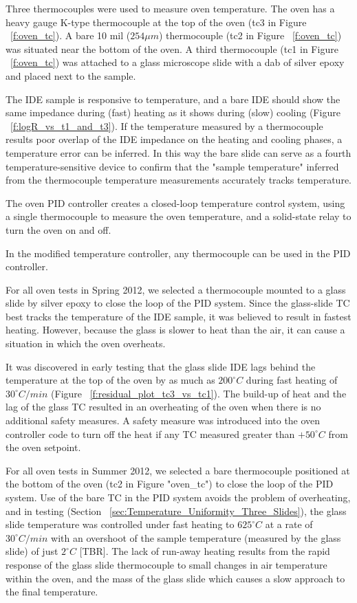\documentclass[12pt,oneside,english]{article}
\begin{document}
	Three thermocouples were used to measure oven temperature.  
	The oven has a heavy gauge K-type thermocouple at the top of the oven (tc3 in Figure ~\ref{f:oven_tc}).  
	A bare 10 mil ($254{\mu}m$) thermocouple (tc2 in Figure ~\ref{f:oven_tc}) was situated near the bottom of the oven.  
	A third thermocouple (tc1 in Figure ~\ref{f:oven_tc}) was attached to a glass microscope slide with a dab of silver epoxy and placed next to the sample.
	
	The IDE sample is responsive to temperature, and a bare IDE should show the same impedance during (fast) heating as it shows during (slow) cooling (Figure ~\ref{f:logR_vs_t1_and_t3}).  
	If the temperature measured by a thermocouple results poor overlap of the IDE impedance on the heating and cooling phases, a temperature error can be inferred.
	In this way the bare slide can serve as a fourth temperature-sensitive device to confirm that the "sample temperature" inferred from the thermocouple temperature measurements accurately tracks temperature.  
	
	The oven PID controller creates a closed-loop temperature control system, using a single thermocouple to measure the oven temperature, and a solid-state relay to turn the oven on and off. 

	In the modified temperature controller, any thermocouple can be used in the PID controller.	
	
	For all oven tests in Spring 2012, we selected a thermocouple mounted to a glass slide by silver epoxy to close the loop of the PID system.
	Since the glass-slide TC best tracks the temperature of the IDE sample, it was believed to result in fastest heating.
	However, because the glass is slower to heat than the air, it can cause a situation in which the oven overheats. 
	
	It was discovered in early testing that the glass slide IDE lags behind the temperature at the top of the oven by as much as $200^{\circ}C$ during fast heating of $30^{\circ}C/min$ (Figure ~\ref{f:residual_plot_tc3_vs_tc1}).  
	The build-up of heat and the lag of the glass TC resulted in an overheating of the oven when there is no additional safety measures.  
	A safety measure was introduced into the oven controller code to turn off the heat if any TC measured greater than $+50^{\circ}C$ from the oven setpoint.

	For all oven tests in Summer 2012, we selected a bare thermocouple positioned at the bottom of the oven (tc2 in Figure "oven\_tc") to close the loop of the PID system.
	Use of the bare TC in the PID system avoids the problem of overheating, and in testing (Section ~\ref{sec:Temperature_Uniformity_Three_Slides}), the glass slide temperature was controlled under fast heating to $625^{\circ}C$ at a rate of $30^{\circ}C/min$ with an overshoot of the sample temperature (measured by the glass slide) of just $2^{\circ}C$  [TBR].  
	The lack of run-away heating results from the rapid response of the glass slide thermocouple to small changes in air temperature within the oven, and the mass of the glass slide which causes a slow approach to the final temperature.
\end{document}
